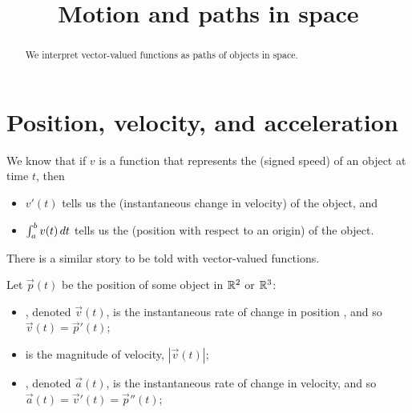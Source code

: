 \documentclass{ximera}
\title[Dig-In:]{Motion and paths in space}
\begin{document}
\begin{abstract}
  We interpret vector-valued functions as paths of objects in space.
\end{abstract}
\maketitle

\section{Position, velocity, and acceleration}

We know that if $v$ is a function that represents the 
(signed speed) of an object at time $t$, then
\begin{itemize}
\item $v'(t)$ tells us the  (instantaneous change in
  velocity) of the object, and
\item $\int_a^b v(t) \mathop{}\!d t$ tells us the  (position
  with respect to an origin) of the object.
\end{itemize}

There is a similar story to be told with vector-valued functions.

\begin{definition}
Let $\vec{p}(t)$ be the position of some object in $\mathbb R^2$ or $\mathbb R^3$:
\begin{itemize}
\item {}, denoted $\vec{v}(t)$, is the instantaneous rate
  of change in position , and so $\vec{v}(t) = \vec{p}'(t)$;
\item {} is the magnitude of velocity, $|\vec v(t)|$;
\item {}, denoted $\vec{a}(t)$, is the instantaneous
  rate of change in velocity, and so $\vec a(t) = \vec{v}'(t) =
  \vec{p}''(t)$;
\end{itemize}
\end{definition}
\end{document}
